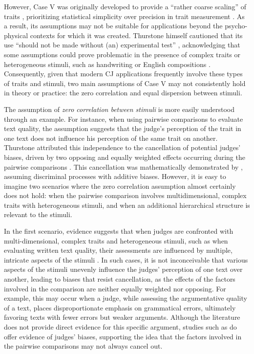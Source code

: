 \documentclass[
  authoryear,
  preprint,
  1p]{elsarticle}
\begin{document}
However, Case V was originally developed to provide a ``rather coarse
scaling'' of traits \citep[pp.~269]{Thurstone_1927b}, prioritizing
statistical simplicity over precision in trait measurement
\citep[pp.~677]{Kelly_et_al_2022}. As a result, its assumptions may not
be suitable for applications beyond the psycho-physical contexts for
which it was created. Thurstone himself cautioned that its use ``should
not be made without (an) experimental test''
\citep[pp.~270]{Thurstone_1927b}, acknowledging that some assumptions
could prove problematic in the presence of complex traits or
heterogeneous stimuli, such as handwriting or English compositions
\citep[pp.~374]{Thurstone_1927a}. Consequently, given that modern CJ
applications frequently involve these types of traits and stimuli, two
main assumptions of Case V may not consistently hold in theory or
practice: the zero correlation and equal dispersion between stimuli.

The assumption of \emph{zero correlation between stimuli} is more easily
understood through an example. For instance, when using pairwise
comparisons to evaluate text quality, the assumption suggests that the
judge's perception of the trait in one text does not influence his
perception of the same trait on another. Thurstone attributed this
independence to the cancellation of potential judges' biases, driven by
two opposing and equally weighted effects occurring during the pairwise
comparisons \citep[pp.~268]{Thurstone_1927b}. This cancellation was
mathematically demonstrated by \citet{Andrich_1978}, assuming
discriminal processes with additive biases. However, it is easy to
imagine two scenarios where the zero correlation assumption almost
certainly does not hold: when the pairwise comparison involves
multidimensional, complex traits with heterogeneous stimuli, and when an
additional hierarchical structure is relevant to the stimuli.

In the first scenario, evidence suggests that when judges are confronted
with multi-dimensional, complex traits and heterogeneous stimuli, such
as when evaluating written text quality, their assessments are
influenced by multiple, intricate aspects of the stimuli
\citep{vanDaal_et_al_2016, Lesterhuis_2018, Chambers_et_al_2022}. In
such cases, it is not inconceivable that various aspects of the stimuli
unevenly influence the judges' perception of one text over another,
leading to biases that resist cancellation, as the effects of the
factors involved in the comparison are neither equally weighted nor
opposing. For example, this may occur when a judge, while assessing the
argumentative quality of a text, places disproportionate emphasis on
grammatical errors, ultimately favoring texts with fewer errors but
weaker arguments. Although the literature does not provide direct
evidence for this specific argument, studies such as
\citet{Pollitt_et_al_2003} do offer evidence of judges' biases,
supporting the idea that the factors involved in the pairwise
comparisons may not always cancel out.
\end{document}
